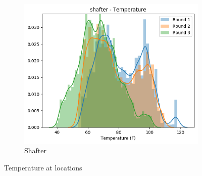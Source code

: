 \documentclass{article}
\begin{document}
\begin{figure}
\begin{subfigure}{0.32\textwidth}
\includegraphics[width=\textwidth]{results/distributions/location_shafter_temperature.png}
\caption{Shafter}
\end{subfigure}
\caption{Temperature at locations}
\label{fig:temperature-locations}
\end{figure}
\end{document}

